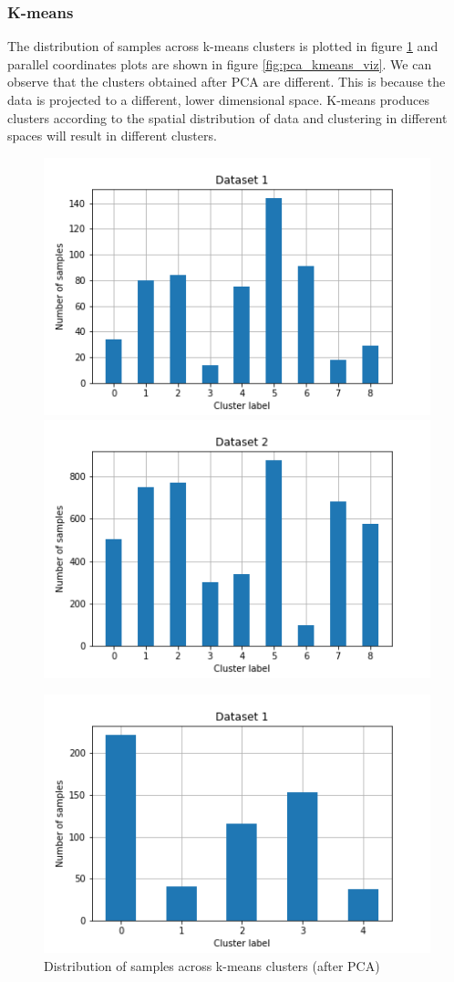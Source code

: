 \documentclass[letterpaper]{article}
\begin{document}
	\subsubsection{K-means}
	The distribution of samples across k-means clusters is plotted in figure \ref{fig:pca_kmeans_hist} and parallel coordinates plots are shown in figure \ref{fig:pca_kmeans_viz}. We can observe that the clusters obtained after PCA are different. This is because the data is projected to a different, lower dimensional space. K-means produces clusters according to the spatial distribution of data and clustering in different spaces will result in different clusters.
	
	\begin{figure}
		\centering
		\begin{minipage}{.48\textwidth}
			\centering
			\includegraphics[width=.5\linewidth]{../../plots/pca_kmeans_hist_1}%
			\centering
			\includegraphics[width=.5\linewidth]{../../plots/pca_kmeans_hist_2}
			\caption{Distribution of samples across k-means clusters (after PCA)}
			\label{fig:pca_kmeans_hist}
		\end{minipage}%
		\hfill
		\begin{minipage}{.48\textwidth}
			\centering
			\includegraphics[width=.5\linewidth]{../../plots/pca_gmm_hist_1}%

\end{minipage}
\end{figure}
\end{document}
